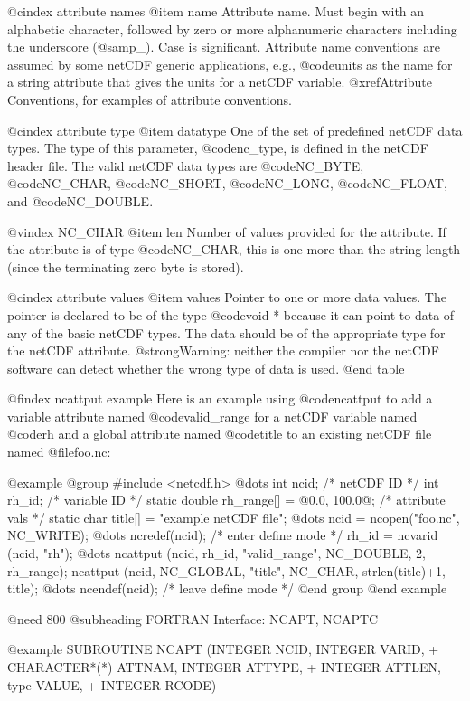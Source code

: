 {@cindex attribute names
@item name
Attribute name.  Must begin with an alphabetic character, followed by
zero or more alphanumeric characters including the underscore
(@samp{_}).  Case is significant.  Attribute name conventions are
assumed by some netCDF generic applications, e.g., @code{units} as the
name for a string attribute that gives the units for a netCDF variable.
@xref{Attribute Conventions}, for examples of attribute conventions.

@cindex attribute type
@item datatype
One of the set of predefined netCDF data types.  The type of this
parameter, @code{nc_type}, is defined in the netCDF header file.  The
valid netCDF data types are @code{NC_BYTE}, @code{NC_CHAR},
@code{NC_SHORT}, @code{NC_LONG}, @code{NC_FLOAT}, and @code{NC_DOUBLE}.

@vindex NC_CHAR
@item len
Number of values provided for the attribute.  If the attribute is of type
@code{NC_CHAR}, this is one more than the string length (since the
terminating zero byte is stored).

@cindex attribute values
@item values
Pointer to one or more data values.  The pointer is declared to be of
the type @code{void *} because it can point to data of any of the basic
netCDF types.  The data should be of the appropriate type for the netCDF
attribute.  @strong{Warning: neither the compiler nor the netCDF
software can detect whether the wrong type of data is used.}
@end table

@findex ncattput example
Here is an example using @code{ncattput} to add a variable attribute
named @code{valid_range} for a netCDF variable named @code{rh} and a
global attribute named @code{title} to an existing netCDF file named
@file{foo.nc}:

@example
@group
#include <netcdf.h>
   @dots{}
int  ncid;                         /* netCDF ID */
int  rh_id;                        /* variable ID */
static double rh_range[] = @{0.0, 100.0@};  /* attribute vals */
static char title[] = "example netCDF file";
   @dots{}
ncid = ncopen("foo.nc", NC_WRITE);
   @dots{}
ncredef(ncid);                    /* enter define mode */
rh_id = ncvarid (ncid, "rh");
   @dots{}
ncattput (ncid, rh_id, "valid_range", NC_DOUBLE, 2, rh_range);
ncattput (ncid, NC_GLOBAL, "title", NC_CHAR, strlen(title)+1,
          title);
   @dots{}
ncendef(ncid);                    /* leave define mode */
@end group
@end example

@need 800
@subheading FORTRAN Interface:  NCAPT, NCAPTC

@example
      SUBROUTINE NCAPT (INTEGER NCID, INTEGER VARID,
     +                  CHARACTER*(*) ATTNAM, INTEGER ATTYPE,
     +                  INTEGER ATTLEN, type VALUE,
     +                  INTEGER RCODE)

}
